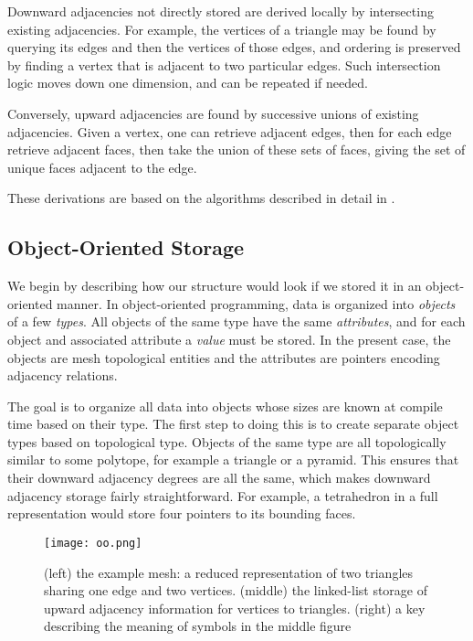 Downward adjacencies not directly stored are derived
locally by intersecting existing adjacencies.
For example, the vertices of a triangle may be found
by querying its edges and then the vertices of those
edges, and ordering is preserved by finding a vertex
that is adjacent to two particular edges.
Such intersection logic moves down one dimension, and
can be repeated if needed.

Conversely, upward adjacencies are found by successive
unions of existing adjacencies.
Given a vertex, one can retrieve adjacent edges, then
for each edge retrieve adjacent faces, then take the
union of these sets of faces, giving the set of unique
faces adjacent to the edge.

These derivations are based on the algorithms described
in detail in \cite{seol2005fmdb}.

\subsection{Object-Oriented Storage}
\label{sec:sisc_oo}

We begin by describing how our structure would look
if we stored it in an object-oriented manner.
In object-oriented programming, data is organized
into {\it objects} of a few {\it types}.
All objects of the same type have the same {\it attributes},
and for each object and associated attribute a {\it value} must be stored.
In the present case, the objects are mesh topological entities
and the attributes are pointers encoding adjacency relations.

The goal is to organize all data into objects whose
sizes are known at compile time based on their type.
The first step to doing this is to create separate object types
based on topological type.
Objects of the same type are all topologically similar to some polytope,
for example a triangle or a pyramid.
This ensures that their downward adjacency degrees are all the same,
which makes downward adjacency storage fairly straightforward.
For example, a tetrahedron in a full representation would store
four pointers to its bounding faces.

\begin{figure}
\begin{center}
\texttt{[image: oo.png]}
\caption{(left) the example mesh: a reduced representation of two
triangles sharing one edge and two vertices.
(middle) the linked-list storage of upward adjacency information
for vertices to triangles.
(right) a key describing the meaning of symbols in the middle figure}
\label{fig:oo}
\end{center}
\end{figure}

